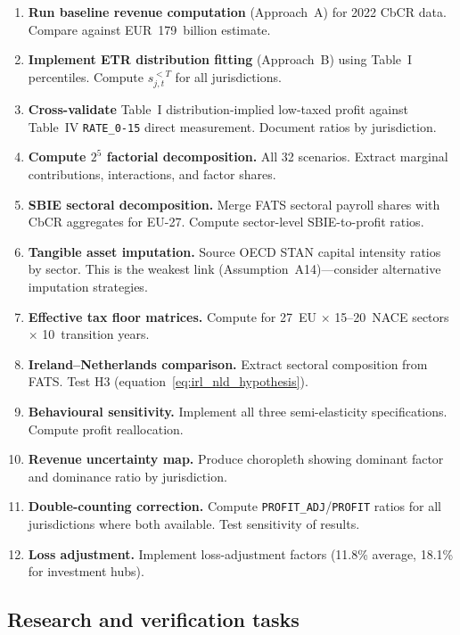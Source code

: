 \documentclass[11pt,a4paper]{article}
\newcommand{\code}[1]{\texttt{#1}}
\begin{document}
\begin{enumerate}
\item \textbf{Run baseline revenue computation} (Approach~A) for 2022 CbCR data. Compare against \citet{barake2022} EUR~179~billion estimate.
\item \textbf{Implement ETR distribution fitting} (Approach~B) using Table~I percentiles. Compute $s_{j,t}^{<T}$ for all jurisdictions.
\item \textbf{Cross-validate} Table~I distribution-implied low-taxed profit against Table~IV \code{RATE\_0-15} direct measurement. Document ratios by jurisdiction.
\item \textbf{Compute $2^5$ factorial decomposition.} All 32 scenarios. Extract marginal contributions, interactions, and factor shares.
\item \textbf{SBIE sectoral decomposition.} Merge FATS sectoral payroll shares with CbCR aggregates for EU-27. Compute sector-level SBIE-to-profit ratios.
\item \textbf{Tangible asset imputation.} Source OECD STAN capital intensity ratios by sector. This is the weakest link (Assumption~A14)---consider alternative imputation strategies.
\item \textbf{Effective tax floor matrices.} Compute for 27~EU $\times$ 15--20~NACE sectors $\times$ 10~transition years.
\item \textbf{Ireland--Netherlands comparison.} Extract sectoral composition from FATS. Test H3 (equation~\ref{eq:irl_nld_hypothesis}).
\item \textbf{Behavioural sensitivity.} Implement all three semi-elasticity specifications. Compute profit reallocation.
\item \textbf{Revenue uncertainty map.} Produce choropleth showing dominant factor and dominance ratio by jurisdiction.
\item \textbf{Double-counting correction.} Compute \code{PROFIT\_ADJ}/\code{PROFIT} ratios for all jurisdictions where both available. Test sensitivity of results.
\item \textbf{Loss adjustment.} Implement \citet{hugger2026} loss-adjustment factors (11.8\% average, 18.1\% for investment hubs).
\end{enumerate}

\subsection{Research and verification tasks}
\end{document}
